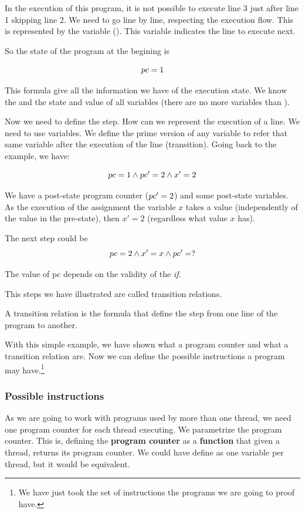 In the execution of this program, it is not possible to execute line 3 just after line 1 skipping line 2. We need to go line by line, respecting the execution flow. 
This is represented by the variable \pc (). This variable indicates the line to execute next.

So the state of the program at the begining is 

\[ pc = 1\]

This formula give all the information we have of the execution state. We know the \pc and the state and value of all variables (there are no more variables than \pc).

Now we need to define the step. 
%
How can we represent the execution of a line.
%
We need to use  variables. 
%
We define the prime version of any variable to refer that same variable after the execution of the line (transition). 
%
Going back to the example, we have:

\[
pc = 1 \wedge pc'=2 \wedge x'=2 
\]

We have a post-state program counter ($pc'=2$) and some post-state variables. 
%
As the execution of the assignment the variable $x$ takes a value (independently of the value in the pre-state), then $x'=2$ (regardless what value $x$ has). 

The next step could be
\[
pc = 2 \wedge x'=x \wedge 	pc'=?
\]

The value of pc depends on the validity of the \textit{if}. 

This steps we have illustrated are called transition relations.

\begin{defn}
A transition relation is the formula that define the step from one line of the program to another.  
\end{defn}

With this simple example, we have shown what a program counter and what a transition relation are. Now we can define the possible instructions a program may have.\footnote{We have just took the set of instructions the programs we are going to proof have.}



\subsubsection{Possible instructions}
As we are going to work with programs used by more than one thread, we need one program counter for each thread executing. 
%
We parametrize the program counter. 
%
This is, defining the \textbf{program counter} as a \textbf{function} that given a thread, returns its program counter. 
%
We could have define as one variable per thread, but it would be equivalent. 

